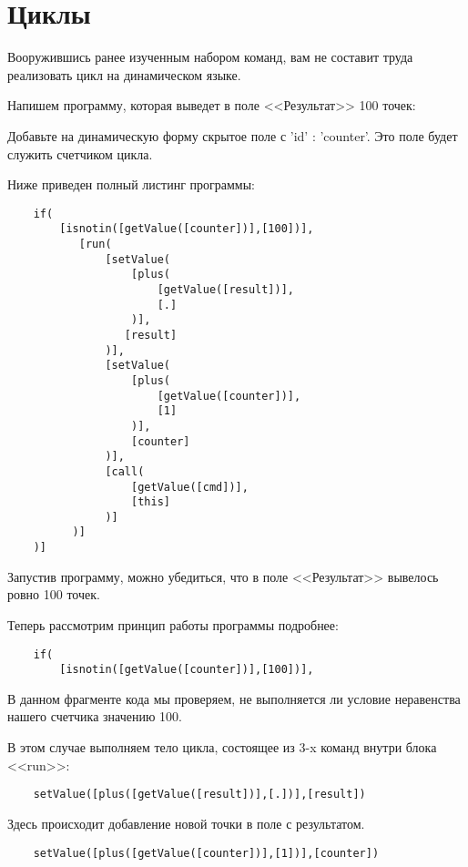 \documentclass[10pt]{book}
\begin{document}
	\section{Циклы}
	\label{sec:loops}
	
	Вооружившись ранее изученным набором команд, вам не составит труда реализовать цикл на динамическом языке.
	
	Напишем программу, которая выведет в поле <<Результат>> 100 точек:
	
	Добавьте  на динамическую форму скрытое поле с 'id' : 'counter'. Это поле будет служить счетчиком цикла.
	
	Ниже приведен полный листинг программы:
	
	\begin{verbatim}
	if(
	    [isnotin([getValue([counter])],[100])],
	       [run(
	           [setValue(
	               [plus(
	                   [getValue([result])],
	                   [.]
                   )],
	              [result]
	           )],
               [setValue(
	               [plus(
	                   [getValue([counter])],
	                   [1]
	               )],
	               [counter]
	           )],
	           [call(
	               [getValue([cmd])],
	               [this]
	           )]
	      )]
	)]
	\end{verbatim}
	
	Запустив программу, можно убедиться, что в поле <<Результат>> вывелось ровно 100 точек.
	
	Теперь рассмотрим принцип работы программы подробнее:
	
	\begin{verbatim}
	if(
	    [isnotin([getValue([counter])],[100])],
	\end{verbatim}
	
	В данном фрагменте кода мы проверяем, не выполняется ли условие неравенства нашего счетчика значению 100.
	
	В этом случае выполняем тело цикла, состоящее из 3-x команд внутри блока <<run>>:
	
	\begin{verbatim}
	setValue([plus([getValue([result])],[.])],[result])
	\end{verbatim}
	
	Здесь происходит добавление новой точки в поле с результатом.
	
	\begin{verbatim}
	setValue([plus([getValue([counter])],[1])],[counter])
	\end{verbatim}
	
\end{document}
